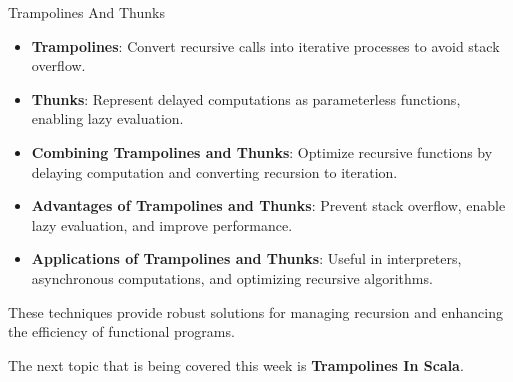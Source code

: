 \begin{notes}{Trampolines And Thunks}
\begin{highlight}
        \begin{itemize}
            \item \textbf{Trampolines}: Convert recursive calls into iterative processes to avoid stack overflow.
            \item \textbf{Thunks}: Represent delayed computations as parameterless functions, enabling lazy evaluation.
            \item \textbf{Combining Trampolines and Thunks}: Optimize recursive functions by delaying computation and converting recursion to iteration.
            \item \textbf{Advantages of Trampolines and Thunks}: Prevent stack overflow, enable lazy evaluation, and improve performance.
            \item \textbf{Applications of Trampolines and Thunks}: Useful in interpreters, asynchronous computations, and optimizing recursive algorithms.
        \end{itemize}
    
        These techniques provide robust solutions for managing recursion and enhancing the efficiency of functional programs.
    
    \end{highlight}
\end{notes}

The next topic that is being covered this week is \textbf{Trampolines In Scala}.

